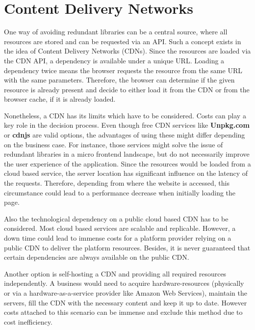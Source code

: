 \chapter{Content Delivery Networks} %
\label{Chapter3}


One way of avoiding redundant libraries can be a central source, where all resources are stored and can be requested via an API. Such a concept exists in the idea of Content Delivery Networks (CDNs).
Since the resources are loaded via the CDN API, a dependency is available under a unique URL. Loading a dependency twice means the browser requests the resource from the same URL with the same parameters. Therefore, the browser can determine if the given resource is already present and decide to either load it from the CDN or from the browser cache, if it is already loaded.\cite{caching_in_browser}

Nonetheless, a CDN has its limits which have to be considered. Costs can play a key role in the decision process.
Even though free CDN services like \textbf{Unpkg.com} or \textbf{cdnjs} are valid options, the advantages of using these might differ depending on the business case.
For instance, those services might solve the issue of redundant libraries in a micro frontend landscape, but do not necessarily improve the user experience of the application. 
Since the resources would be loaded from a cloud based service, the server location has significant influence on the latency of the requests. Therefore, depending from where the website is accessed, this circumstance could lead to a performance decrease when initially loading the page.\cite{cdn_general}

Also the technological dependency on a public cloud based CDN has to be considered. Most cloud based services are scalable and replicable. However, a down time could lead to immense costs for a platform provider relying on a public CDN to deliver the platform resources.
Besides, it is never guaranteed that certain dependencies are always available on the public CDN.

Another option is self-hosting a CDN and providing all required resources independently. A business would need to acquire hardware-resources (physically or via a hardware-as-a-service provider like Amazon Web Services), maintain the servers, fill the CDN with the necessary content and keep it up to date. However costs attached to this scenario can be immense and exclude this method due to cost inefficiency.\cite{Meassuring_a_commercial_CDN}

